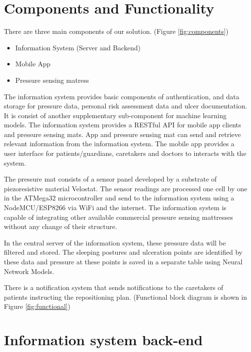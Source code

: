 \section{Components and Functionality}

There are three main components of our solution. (Figure \ref{fig:components})
\begin{itemize}
	\item Information System (Server and Backend)
	\item Mobile App
	\item Pressure sensing matress
\end{itemize}


The information system provides basic components of authentication, and data storage for pressure data, personal risk assessment data and ulcer documentation. It is consist of another supplementary sub-component for machine learning models. The information system provides a RESTful API for mobile app clients and pressure sensing mats. App and pressure sensing mat can send and retrieve relevant information from the information system. The mobile app provides a user interface for patients/guardians, caretakers and doctors to interacts with the system.

The pressure mat consists of a sensor panel developed by a substrate of piezoresistive material Velostat\textsuperscript{\textregistered}. The sensor readings are processed one cell by one in the ATMega32\textsuperscript{\textregistered} microcontroller and send to the information system using a NodeMCU/ESP8266\textsuperscript{\textregistered} via WiFi and the internet. The information system is capable of integrating other available commercial pressure sensing mattresses without any change of their structure. 

In the central server of the information system, these pressure data will be filtered and stored. The sleeping postures and ulceration points are identified by these data and pressure at these points is saved in a separate table using Neural Network Models. 

There is a notification system that sends notifications to the caretakers of patients instructing the repositioning plan. (Functional block diagram is shown in Figure \ref{fig:functional})


\section{Information system back-end}


